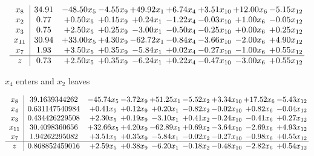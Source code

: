 \documentclass[8pt]{article}
\begin{document}
 \[\begin{array}{c| c c@{\hskip 2pt} c@{\hskip 2pt} c@{\hskip 2pt} c@{\hskip 2pt} c@{\hskip 2pt} c@{\hskip 2pt} c@{\hskip 2pt} }
 x_{8}   &  34.91 & -48.50 x_{5} & -4.55 x_{9} & + 49.92 x_{1} & +  6.74 x_{4} & +  3.51 x_{10} & + 12.00 x_{6} & -5.15 x_{12}\\
 x_{2}   &  0.77 & +  0.50 x_{5} & +  0.15 x_{9} & +  0.24 x_{1} & -1.22 x_{4} & -0.03 x_{10} & +  1.00 x_{6} & -0.05 x_{12}\\
 x_{3}   &  0.75 & +  2.50 x_{5} & +  0.25 x_{9} & -3.00 x_{1} & -0.50 x_{4} & -0.25 x_{10} & +  0.00 x_{6} & +  0.25 x_{12}\\
 x_{11}   &  30.94 & + 33.00 x_{5} & +  4.30 x_{9} & -62.72 x_{1} & -0.84 x_{4} & -3.66 x_{10} & -2.00 x_{6} & +  4.90 x_{12}\\
 x_{7}   &  1.93 & +  3.50 x_{5} & +  0.35 x_{9} & -5.84 x_{1} & +  0.02 x_{4} & -0.27 x_{10} & -1.00 x_{6} & +  0.55 x_{12}\\
\hline
z    &  0.73 & +  2.50 x_{5} & +  0.35 x_{9} & -6.24 x_{1} & +  0.22 x_{4} & -0.47 x_{10} & -3.00 x_{6} & +  0.55 x_{12}\\
\end{array}\]


 $ x_{4} $ enters and $ x_{2} $ leaves 

 \[\begin{array}{c| c c@{\hskip 2pt} c@{\hskip 2pt} c@{\hskip 2pt} c@{\hskip 2pt} c@{\hskip 2pt} c@{\hskip 2pt} c@{\hskip 2pt} }
 x_{8}   &  39.1639344262 & -45.74 x_{5} & -3.72 x_{9} & + 51.25 x_{1} & -5.52 x_{2} & +  3.34 x_{10} & + 17.52 x_{6} & -5.43 x_{12}\\
 x_{4}   &  0.631147540984 & +  0.41 x_{5} & +  0.12 x_{9} & +  0.20 x_{1} & -0.82 x_{2} & -0.02 x_{10} & +  0.82 x_{6} & -0.04 x_{12}\\
 x_{3}   &  0.434426229508 & +  2.30 x_{5} & +  0.19 x_{9} & -3.10 x_{1} & +  0.41 x_{2} & -0.24 x_{10} & -0.41 x_{6} & +  0.27 x_{12}\\
 x_{11}   &  30.4098360656 & + 32.66 x_{5} & +  4.20 x_{9} & -62.89 x_{1} & +  0.69 x_{2} & -3.64 x_{10} & -2.69 x_{6} & +  4.93 x_{12}\\
 x_{7}   &  1.94262295082 & +  3.51 x_{5} & +  0.35 x_{9} & -5.84 x_{1} & -0.02 x_{2} & -0.27 x_{10} & -0.98 x_{6} & +  0.55 x_{12}\\
\hline
z    &  0.868852459016 & +  2.59 x_{5} & +  0.38 x_{9} & -6.20 x_{1} & -0.18 x_{2} & -0.48 x_{10} & -2.82 x_{6} & +  0.54 x_{12}\\
\end{array}\]
\end{document}
